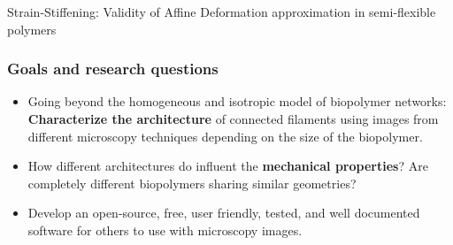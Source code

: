 \documentclass[9pt]{beamer}
\begin{document}
\begin{frame}{Strain-Stiffening: Validity of Affine Deformation approximation in semi-flexible polymers}
\end{frame}
\begin{frame}
  \frametitle{Goals and research questions}
  \begin{exampleblock}{}
  \begin{itemize}
    \item<1-> Going beyond the homogeneous and isotropic model of biopolymer networks: \textbf{Characterize the architecture} of connected filaments using images from different microscopy techniques depending on the size of the biopolymer.
    \item<2-> How different architectures do influent the \textbf{mechanical properties}? Are completely different biopolymers sharing similar geometries?
    \item<3-> Develop an open-source, free, user friendly, tested, and well documented software for others to use with microscopy images.
  \end{itemize}
  \end{exampleblock}
\end{frame}
\end{document}

